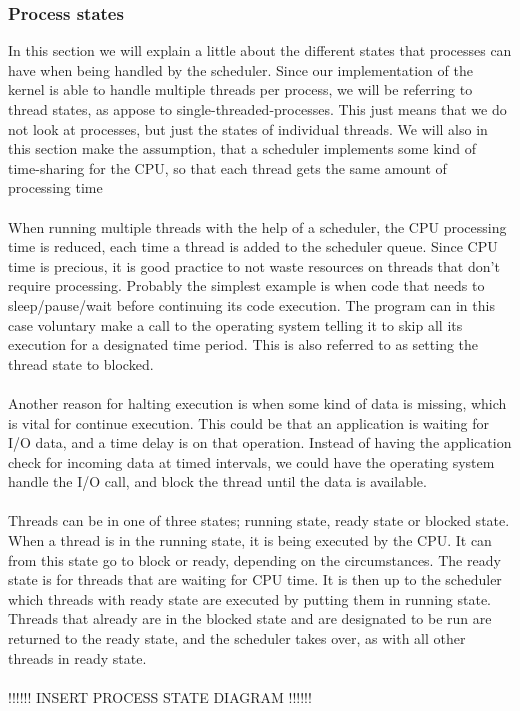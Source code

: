 \subsubsection{Process states}
In this section we will explain a little about the different states that processes can have when being handled by the scheduler. Since our implementation of the kernel is able to handle multiple threads per process, we will be referring to thread states, as appose to single-threaded-processes. This just means that we do not look at processes, but just the states of individual threads. We will also in this section make the assumption, that a scheduler implements some kind of time-sharing for the CPU, so that each thread gets the same amount of processing time
\\
\\
When running multiple threads with the help of a scheduler, the CPU processing time is reduced, each time a thread is added to the scheduler queue. Since CPU time is precious, it is good practice to not waste resources on threads that don't require processing. Probably the simplest example is when code that needs to sleep/pause/wait before continuing its code execution. The program can in this case voluntary make a call to the operating system telling it to skip all its execution for a designated time period. This is also referred to as setting the thread state to blocked.
\\
\\
Another reason for halting execution is when some kind of data is missing, which is vital for continue execution. This could be that an application is waiting for I/O data, and a time delay is on that operation. Instead of having the application check for incoming data at timed intervals, we could have the operating system handle the I/O call, and block the thread until the data is available.
\\
\\
Threads can be in one of three states; running state, ready state or blocked state.
When a thread is in the running state, it is being executed by the CPU. It can from this state go to block or ready, depending on the circumstances. The ready state is for threads that are waiting for CPU time. It is then up to the scheduler which threads with ready state are executed by putting them in running state. Threads that already are in the blocked state and are designated to be run are returned to the ready state, and the scheduler takes over, as with all other threads in ready state.
\\
\\
!!!!!! INSERT PROCESS STATE DIAGRAM !!!!!!

